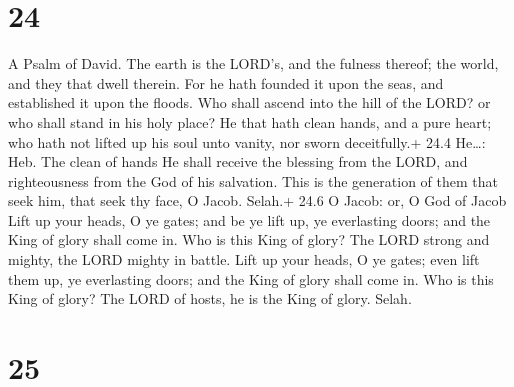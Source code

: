 \hypertarget{section-23}{%
\section{24}\label{section-23}}

A Psalm of David.  The earth is the LORD's, and the fulness
thereof; the world, and they that dwell therein.  For he
hath founded it upon the seas, and established it upon the floods.
 Who shall ascend into the hill of the LORD? or who shall
stand in his holy place?  He that hath clean hands, and a
pure heart; who hath not lifted up his soul unto vanity, nor sworn
deceitfully.+ 24.4 He\ldots: Heb. The clean of hands  He
shall receive the blessing from the LORD, and righteousness from the God
of his salvation.  This is the generation of them that seek
him, that seek thy face, O Jacob. Selah.+ 24.6 O Jacob: or, O God of
Jacob  Lift up your heads, O ye gates; and be ye lift up, ye
everlasting doors; and the King of glory shall come in.  Who
is this King of glory? The LORD strong and mighty, the LORD mighty in
battle.  Lift up your heads, O ye gates; even lift them up,
ye everlasting doors; and the King of glory shall come in. 
Who is this King of glory? The LORD of hosts, he is the King of glory.
Selah.

\hypertarget{section-24}{%
\section{25}\label{section-24}}

